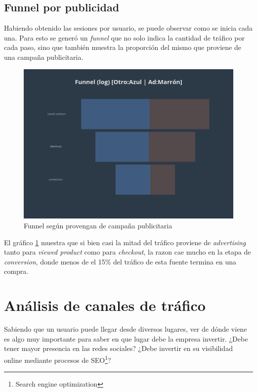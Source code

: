 \documentclass[a4paper]{article}
\begin{document}
\subsection{Funnel por publicidad}

Habiendo obtenido las sesiones por usuario, se puede observar como se inicia cada una. Para esto se generó un \textit{funnel} que no solo indica la cantidad de tráfico por cada paso, sino que también muestra la proporción del mismo que proviene de una campaña publicitaria.

\begin{figure}[!h]
	\includegraphics[width=\linewidth]{figures/200-advertisement-funnel.png}
	\caption{Funnel según provengan de campaña publicitaria}
	\label{fig:funnel}
\end{figure}

El gráfico \ref{fig:funnel} muestra que si bien casi la mitad del tráfico proviene de \textit{advertising} tanto para \textit{viewed product} como para \textit{checkout}, la razon cae mucho en la etapa de \textit{conversion}, donde menos de el 15\% del tráfico de esta fuente termina en una compra.

\section{Análisis de canales de tráfico}

Sabiendo que un usuario puede llegar desde diversos lugares, ver de dónde viene es algo muy importante para saber en que lugar debe la empresa invertir. ¿Debe tener mayor presencia en las redes sociales? ¿Debe invertir en su visibilidad online mediante procesos de SEO\footnote{Search engine optimization}? 
\end{document}
